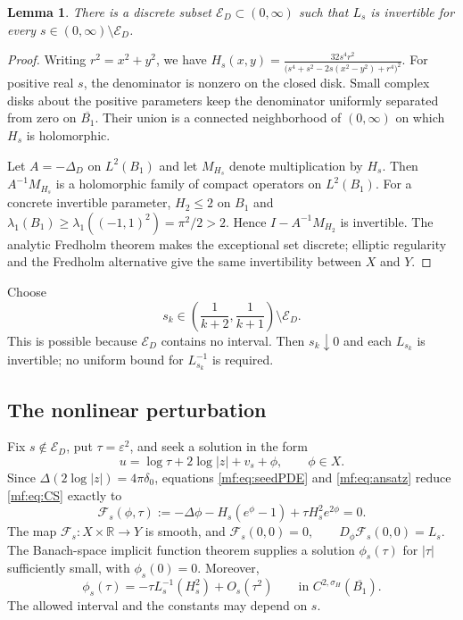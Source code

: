 \documentclass[11pt,reqno]{amsart}
\numberwithin{equation}{section}
\newtheorem{lemma}[theorem]{Lemma}
\theoremstyle{definition}
\theoremstyle{remark}
\newcommand{\R}{\mathbb R}
\newcommand{\eps}{\varepsilon}
\begin{document}
\begin{lemma}\label{mf:lem:generic}
There is a discrete subset $\mathcal E_D\subset(0,\infty)$ such that $L_s$ is
invertible for every $s\in(0,\infty)\setminus \mathcal E_D$.
\end{lemma}
\begin{proof}
Writing $r^2=x^2+y^2$, we have
\(
H_s(x,y)=\frac{32s^4r^2}
{\bigl(s^4+s^2-2s(x^2-y^2)+r^4\bigr)^2}.
\)
For positive real $s$, the denominator is nonzero on the closed disk.
Small complex disks about the positive parameters keep the denominator
uniformly separated from zero on $\overline{B_1}$. Their union is a
connected neighborhood of $(0,\infty)$ on which $H_s$ is holomorphic.

Let $A=-\Delta_D$ on $L^2(B_1)$ and let $M_{H_s}$ denote
multiplication by $H_s$. Then $A^{-1}M_{H_s}$ is a holomorphic family
of compact operators on $L^2(B_1)$. For a concrete invertible parameter, $H_2\le2$ on $B_1$ and
\(\lambda_1(B_1)\ge\lambda_1((-1,1)^2)=\pi^2/2>2.\)
Hence $I-A^{-1}M_{H_2}$ is invertible. The analytic Fredholm theorem
\cite[Theorem~5.3.1]{FredholmNotes} makes the exceptional set discrete;
elliptic regularity and the Fredholm alternative give the same
invertibility between $X$ and $Y$.
\end{proof}

Choose
\begin{equation}\label{mf:eq:selects}
s_k\in\left(\frac1{k+2},\frac1{k+1}\right)\setminus \mathcal E_D.
\end{equation}
This is possible because $\mathcal E_D$ contains no interval.
Then $s_k\downarrow0$ and each $L_{s_k}$ is invertible;
no uniform bound for $L_{s_k}^{-1}$ is required.

\subsection{The nonlinear perturbation}

Fix $s\notin \mathcal E_D$, put $\tau=\eps^2$, and seek a solution in the form
\begin{equation}\label{mf:eq:ansatz}
u=\log\tau+2\log|z|+v_s+\phi,\qquad \phi\in X.
\end{equation}
Since $\Delta(2\log|z|)=4\pi\delta_0$, equations
\eqref{mf:eq:seedPDE} and \eqref{mf:eq:ansatz} reduce \eqref{mf:eq:CS} exactly to
\begin{equation}\label{mf:eq:nonlinear}
\mathcal F_s(\phi,\tau):=
-\Delta\phi-H_s(e^\phi-1)+\tau H_s^2e^{2\phi}=0.
\end{equation}
The map $\mathcal F_s:X\times\R\to Y$ is smooth, and
\(\mathcal F_s(0,0)=0,\qquad D_\phi\mathcal F_s(0,0)=L_s.\)
The Banach-space implicit function theorem supplies a solution
$\phi_s(\tau)$ for $|\tau|$ sufficiently small, with $\phi_s(0)=0$.
Moreover,
\begin{equation}\label{mf:eq:phiExpansion}
\phi_s(\tau)=-\tau L_s^{-1}(H_s^2)+O_s(\tau^2)
\qquad\text{in }C^{2,\sigma_H}(\overline{B_1}).
\end{equation}
The allowed interval and the constants may depend on $s$.
\end{document}
